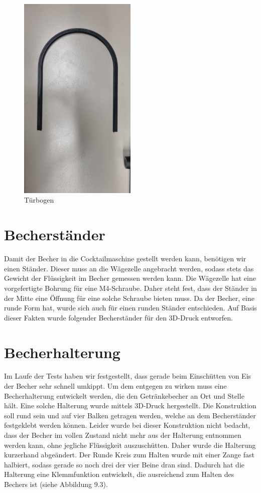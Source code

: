 \documentclass[10pt,a4paper]{report}
\begin{document}
	\begin{figure}[htb]
		\includegraphics[width=0.5\textwidth]{Abb.4_Verkleidung}
		\centering
		\caption{Türbogen}
	\end{figure}
	
	\section{Becherständer}
	Damit der Becher in die Cocktailmaschine gestellt werden kann, benötigen wir einen Ständer. Dieser muss an die Wägezelle angebracht werden, sodass stets das Gewicht der Flüssigkeit im Becher gemessen werden kann. Die Wägezelle hat eine vorgefertigte Bohrung für eine M4-Schraube. Daher steht fest, dass der Ständer in der Mitte eine Öffnung für eine solche Schraube bieten muss. Da der Becher, eine runde Form hat, wurde sich auch für einen runden Ständer entschieden. Auf Basis dieser Fakten wurde folgender Becherständer für den 3D-Druck entworfen.
	
	\section{Becherhalterung}
	Im Laufe der Tests haben wir festgestellt, dass gerade beim Einschütten von Eis der Becher sehr schnell umkippt. Um dem entgegen zu wirken muss eine Becherhalterung entwickelt werden, die den Getränkebecher an Ort und Stelle hält. Eine solche Halterung wurde mittels 3D-Druck hergestellt. Die Konstruktion soll rund sein und auf vier Balken getragen werden, welche an dem Becherständer festgeklebt werden können. Leider wurde bei dieser Konstruktion nicht bedacht, dass der Becher im vollen Zustand nicht mehr aus der Halterung entnommen werden kann, ohne jegliche Flüssigkeit auszuschütten. Daher wurde die Halterung kurzerhand abgeändert. Der Runde Kreis zum Halten wurde mit einer Zange fast halbiert, sodass gerade so noch drei der vier Beine dran sind. Dadurch hat die Halterung eine Klemmfunktion entwickelt, die ausreichend zum Halten des Bechers ist (siehe Abbildung 9.3).\\
\end{document}

